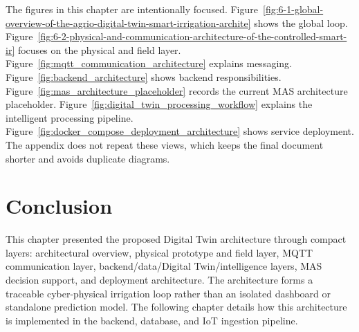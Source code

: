 The figures in this chapter are intentionally focused. Figure~\ref{fig:6-1-global-overview-of-the-agrio-digital-twin-smart-irrigation-archite} shows the global loop. Figure~\ref{fig:6-2-physical-and-communication-architecture-of-the-controlled-smart-ir} focuses on the physical and field layer. Figure~\ref{fig:mqtt_communication_architecture} explains messaging. Figure~\ref{fig:backend_architecture} shows backend responsibilities. Figure~\ref{fig:mas_architecture_placeholder} records the current MAS architecture placeholder. Figure~\ref{fig:digital_twin_processing_workflow} explains the intelligent processing pipeline. Figure~\ref{fig:docker_compose_deployment_architecture} shows service deployment. The appendix does not repeat these views, which keeps the final document shorter and avoids duplicate diagrams.

\section{Conclusion}

This chapter presented the proposed Digital Twin architecture through compact layers: architectural overview, physical prototype and field layer, MQTT communication layer, backend/data/Digital Twin/intelligence layers, MAS decision support, and deployment architecture. The architecture forms a traceable cyber-physical irrigation loop rather than an isolated dashboard or standalone prediction model. The following chapter details how this architecture is implemented in the backend, database, and IoT ingestion pipeline.
